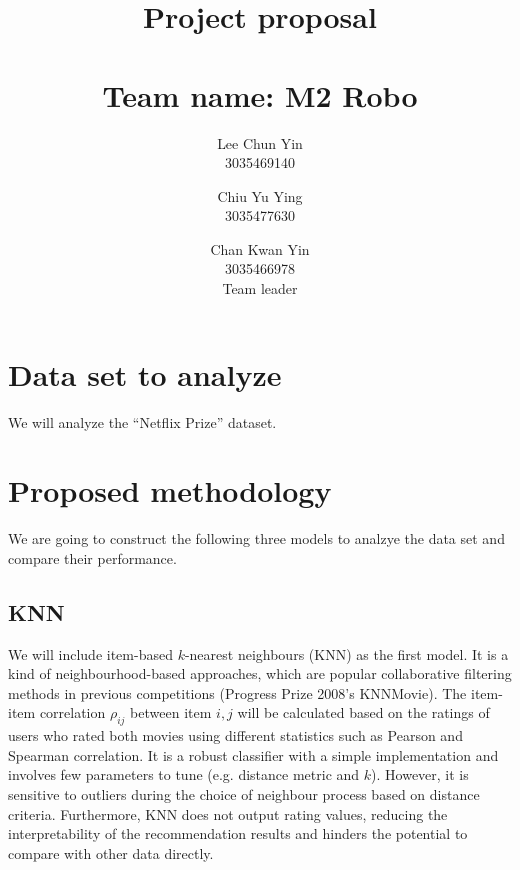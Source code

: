 \documentclass[final]{cvpr}
\newcommand{\q}[1]{\enquote{#1}}
\begin{document}
\title{
	Project proposal \\~\\
	\large{Team name: M2 Robo}
}

\author{
	Lee Chun Yin\\
	3035469140\\
	\and
	Chiu Yu Ying\\
	3035477630
	\and
	Chan Kwan Yin\\
	3035466978 \\
	Team leader
}

\maketitle

\clearpage

\section{Data set to analyze}

We will analyze the \q{Netflix Prize} dataset.

\section{Proposed methodology}
We are going to construct the following three models to analzye the data set
and compare their performance.

\subsection{KNN}
We will include item-based $k$-nearest neighbours (KNN) as the first model.
It is a kind of neighbourhood-based approaches, which are popular collaborative filtering methods in previous competitions (Progress Prize 2008's KNNMovie).
The item-item correlation $\rho_{ij}$ between item $i, j$ will be calculated based on the ratings of users who rated both movies
using different statistics such as Pearson and Spearman correlation.
It is a robust classifier with a simple implementation and involves few parameters to tune (e.g. distance metric and $k$).
However, it is sensitive to outliers during the choice of neighbour process based on distance criteria.
Furthermore, KNN does not output rating values,
reducing the interpretability of the recommendation results
and hinders the potential to compare with other data directly.
\end{document}
